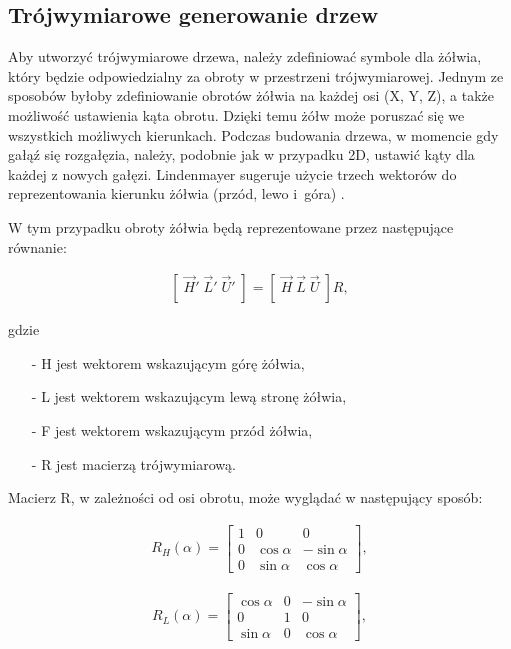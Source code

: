 \documentclass[a4paper,twoside,12pt]{report}
\begin{document}
\subsection{Trójwymiarowe generowanie drzew}

Aby utworzyć trójwymiarowe drzewa, należy zdefiniować symbole dla żółwia, 
który będzie odpowiedzialny za obroty w przestrzeni trójwymiarowej. 
Jednym ze sposobów byłoby zdefiniowanie obrotów żółwia na każdej osi (X, Y, Z), 
a także możliwość ustawienia kąta obrotu. Dzięki temu żółw może poruszać się we 
wszystkich możliwych kierunkach. Podczas budowania drzewa, w momencie gdy gałąź 
się rozgałęzia, należy, podobnie jak w przypadku 2D, ustawić kąty dla każdej z 
nowych gałęzi. Lindenmayer sugeruje użycie trzech wektorów 
do reprezentowania kierunku żółwia (przód, lewo i~góra) \cite{beautyofplants}.

W tym przypadku obroty żółwia będą reprezentowane przez 
następujące równanie:

\begin{gather}
	\left[ \; \overrightarrow{H}' \; \overrightarrow{L}' \; \overrightarrow{U}' \; \right] 
	= \left[ \; \overrightarrow{H} \; \overrightarrow{L} \;  \overrightarrow{U} \; \right] R,
\end{gather}

gdzie 
\begin{itemize}
	\item[-] H jest wektorem wskazującym górę żółwia, 
	\item[-] L jest wektorem wskazującym lewą stronę żółwia, 
	\item[-] F jest wektorem wskazującym przód żółwia,
	\item[-] R jest macierzą trójwymiarową.
\end{itemize}
Macierz R, w zależności od osi obrotu, 
może wyglądać w następujący sposób:

\begin{gather}
	R_{H}(\alpha) =  
	\begin{bmatrix}
		1 & 0 & 0 \\
		0 & \cos{\alpha} & -\sin{\alpha}   \\
		0 & \sin{\alpha} & \cos{\alpha}  
	\end{bmatrix},
\end{gather}

\begin{gather}
	R_{L}(\alpha) =  
	\begin{bmatrix}
		\cos{\alpha} & 0 & -\sin{\alpha}   \\
		0 & 1 & 0 \\
		\sin{\alpha} & 0 &  \cos{\alpha}
	\end{bmatrix},
\end{gather}
\end{document}
